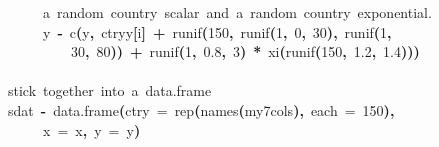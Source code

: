 \documentclass[a4paper]{article}
\newcommand{\hlnumber}[1]{\textcolor[rgb]{0.0823529411764706,0.0784313725490196,0.709803921568627}{#1}}%
\newcommand{\hlfunctioncall}[1]{\textcolor[rgb]{1,0,0}{#1}}%
\newcommand{\hlkeyword}[1]{\textcolor[rgb]{0,0,0}{\textbf{#1}}}%
\newcommand{\hlargument}[1]{\textcolor[rgb]{0.694117647058824,0.247058823529412,0.0196078431372549}{#1}}%
\newcommand{\hlcomment}[1]{\textcolor[rgb]{0.8,0.8,0.8}{#1}}%
\newcommand{\hlassignement}[1]{\textcolor[rgb]{0.215686274509804,0.215686274509804,0.384313725490196}{\textbf{#1}}}%
\newcommand{\hlsymbol}[1]{\textcolor[rgb]{0,0,0}{#1}}%
\newcommand{\hlprompt}[1]{\textcolor[rgb]{0,0,0}{#1}}%
\newcommand{\hlstd}[1]{\textcolor[rgb]{0,0,0}{#1}}%
\newenvironment{Houtput}{\raggedright}{%
%
}
\begin{document}
\begin{Houtput}
\hlstd{}\hlprompt{{\ }}{\ }{\ }{\ }{\ }\hlcomment{\usebox{\hlnormalsizeboxhash}{\ }a{\ }random{\ }country{\ }scalar{\ }and{\ }a{\ }random{\ }country{\ }exponential.}\hspace*{\fill}\\
\hlstd{}\hlprompt{{\ }}{\ }{\ }{\ }{\ }\hlsymbol{y}{\ }\hlassignement{\usebox{\hlnormalsizeboxlessthan}-}{\ }\hlfunctioncall{c}\hlkeyword{(}\hlsymbol{y}\hlkeyword{,}{\ }\hlsymbol{ctry\usebox{\hlnormalsizeboxunderscore}y}\hlkeyword{[}\hlsymbol{i}\hlkeyword{]}{\ }\hlkeyword{+}{\ }\hlfunctioncall{runif}\hlkeyword{(}\hlnumber{150}\hlkeyword{,}{\ }\hlfunctioncall{runif}\hlkeyword{(}\hlnumber{1}\hlkeyword{,}{\ }\hlnumber{0}\hlkeyword{,}{\ }\hlnumber{30}\hlkeyword{)}\hlkeyword{,}{\ }\hlfunctioncall{runif}\hlkeyword{(}\hlnumber{1}\hlkeyword{,}\hspace*{\fill}\\
\hlstd{}\hlprompt{{\ }}{\ }{\ }{\ }{\ }{\ }{\ }{\ }{\ }\hlnumber{30}\hlkeyword{,}{\ }\hlnumber{80}\hlkeyword{)}\hlkeyword{)}{\ }\hlkeyword{+}{\ }\hlfunctioncall{runif}\hlkeyword{(}\hlnumber{1}\hlkeyword{,}{\ }\hlnumber{0.8}\hlkeyword{,}{\ }\hlnumber{3}\hlkeyword{)}{\ }\hlkeyword{*}{\ }\hlsymbol{xi}\hlkeyword{\usebox{\hlnormalsizeboxhat}}\hlkeyword{(}\hlfunctioncall{runif}\hlkeyword{(}\hlnumber{150}\hlkeyword{,}{\ }\hlnumber{1.2}\hlkeyword{,}{\ }\hlnumber{1.4}\hlkeyword{)}\hlkeyword{)}\hlkeyword{)}\hspace*{\fill}\\
\hlstd{}\hlprompt{{\ }}\hlkeyword{\usebox{\hlnormalsizeboxclosebrace}}\mbox{}
\normalfont
\hspace*{\fill}\\
\hlstd{}\ttfamily\noindent
\hlprompt{\usebox{\hlnormalsizeboxgreaterthan}{\ }}\hlcomment{\usebox{\hlnormalsizeboxhash}{\ }stick{\ }together{\ }into{\ }a{\ }data.frame}\mbox{}
\normalfont
\hspace*{\fill}\\
\hlstd{}\ttfamily\noindent
\hlprompt{\usebox{\hlnormalsizeboxgreaterthan}{\ }}\hlsymbol{sdat}{\ }\hlassignement{\usebox{\hlnormalsizeboxlessthan}-}{\ }\hlfunctioncall{data.frame}\hlkeyword{(}\hlargument{ctry}{\ }\hlargument{=}{\ }\hlfunctioncall{rep}\hlkeyword{(}\hlfunctioncall{names}\hlkeyword{(}\hlsymbol{my7cols}\hlkeyword{)}\hlkeyword{,}{\ }\hlargument{each}{\ }\hlargument{=}{\ }\hlnumber{150}\hlkeyword{)}\hlkeyword{,}\hspace*{\fill}\\
\hlstd{}\hlprompt{{\ }}{\ }{\ }{\ }{\ }\hlargument{x}{\ }\hlargument{=}{\ }\hlsymbol{x}\hlkeyword{,}{\ }\hlargument{y}{\ }\hlargument{=}{\ }\hlsymbol{y}\hlkeyword{)}\mbox{}
\normalfont
\hspace*{\fill}\\
\hlstd{}
\end{Houtput}
\end{document}
